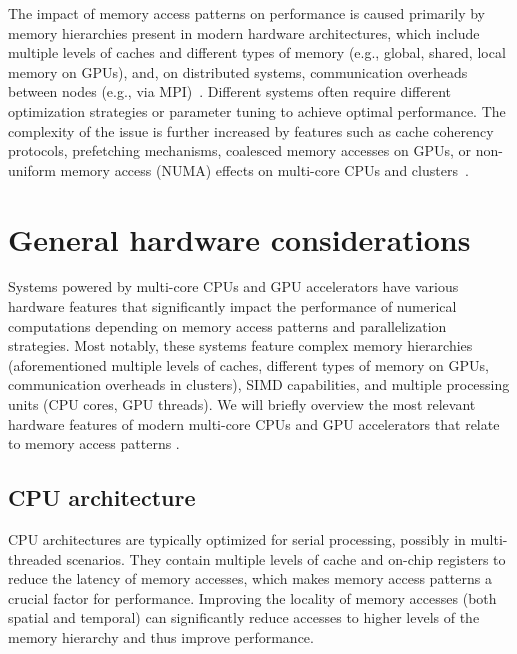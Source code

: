 The impact of memory access patterns on performance is caused primarily by memory hierarchies present in modern hardware architectures, which include multiple levels of caches and different types of memory (e.g., global, shared, local memory on GPUs), and, on distributed systems, communication overheads between nodes (e.g., via MPI)~\cite{hennessy2019computer,drepper2007every}. Different systems often require different optimization strategies or parameter tuning to achieve optimal performance. The complexity of the issue is further increased by features such as cache coherency protocols, prefetching mechanisms, coalesced memory accesses on GPUs, or non-uniform memory access (NUMA) effects on multi-core CPUs and clusters~\cite{cuda_programming_guide}.


\section{General hardware considerations}\label{sec:general-hardware-considerations}

Systems powered by multi-core CPUs and GPU accelerators have various hardware features that significantly impact the performance of numerical computations depending on memory access patterns and parallelization strategies. Most notably, these systems feature complex memory hierarchies (aforementioned multiple levels of caches, different types of memory on GPUs, communication overheads in clusters), SIMD capabilities, and multiple processing units (CPU cores, GPU threads).
We will briefly overview the most relevant hardware features of modern multi-core CPUs and GPU accelerators that relate to memory access patterns .


\subsection{CPU architecture}\label{sec:cpu-architecture}


CPU architectures are typically optimized for serial processing, possibly in multi-threaded scenarios. They contain multiple levels of cache and on-chip registers to reduce the latency of memory accesses, which makes memory access patterns a crucial factor for performance. Improving the locality of memory accesses (both spatial and temporal) can significantly reduce accesses to higher levels of the memory hierarchy and thus improve performance.

